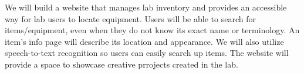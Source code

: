 We will build a website that manages lab inventory and provides an accessible way for lab users to locate equipment. Users will be able to search for items/equipment, even when they do not know its exact name or terminology. An item's info page will describe its location and appearance. We will also utilize speech-to-text recognition so users can easily search up items. The website will provide a space to showcase creative prrojects created in the lab. 